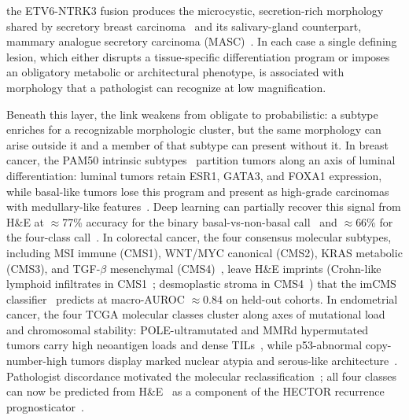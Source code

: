 the ETV6-NTRK3 fusion produces the microcystic, secretion-rich morphology shared by secretory breast carcinoma~\cite{tognonExpressionETV6NTRK3Gene2002} and its salivary-gland counterpart, mammary analogue secretory carcinoma (MASC)~\cite{skalovaMammaryAnalogueSecretory2010}.
In each case a single defining lesion, which either disrupts a tissue-specific differentiation program or imposes an obligatory metabolic or architectural phenotype, is associated with morphology that a pathologist can recognize at low magnification.

Beneath this layer, the link weakens from obligate to probabilistic: a subtype enriches for a recognizable morphologic cluster, but the same morphology can arise outside it and a member of that subtype can present without it. 
In breast cancer, the PAM50 intrinsic subtypes~\cite{parkerSupervisedRiskPredictor2009} partition tumors along an axis of luminal differentiation: luminal tumors retain ESR1, GATA3, and FOXA1 expression, while basal-like tumors lose this program and present as high-grade carcinomas~\cite{koboldtComprehensiveMolecularPortraits2012} with medullary-like features~\cite{livasyPhenotypicEvaluationBasallike2006}.
Deep learning can partially recover this signal from H\&E at $\approx$77\% accuracy for the binary basal-vs-non-basal call~\cite{coutureImageAnalysisDeep2018} and $\approx$66\% for the four-class call~\cite{jaberDeepLearningImagebased2020}.
In colorectal cancer, the four consensus molecular subtypes, including MSI immune (CMS1), WNT/MYC canonical (CMS2), KRAS metabolic (CMS3), and TGF-$\beta$ mesenchymal (CMS4)~\cite{guinneyConsensusMolecularSubtypes2015}, leave H\&E imprints (Crohn-like lymphoid infiltrates in CMS1~\cite{greensonPathologicPredictorsMicrosatellite2009}; desmoplastic stroma in CMS4~\cite{isellaStromalContributionColorectal2015}) that the imCMS classifier~\cite{sirinukunwattanaImagebasedConsensusMolecular2021} predicts at macro-AUROC $\approx$0.84 on held-out cohorts.
In endometrial cancer, the four TCGA molecular classes cluster along axes of mutational load and chromosomal stability: POLE-ultramutated and MMRd hypermutated tumors carry high neoantigen loads and dense TILs~\cite{howittAssociationPolymeraseEMutated2015}, while p53-abnormal copy-number-high tumors display marked nuclear atypia and serous-like architecture~\cite{levineIntegratedGenomicCharacterization2013, fremondInterpretableDeepLearning2023}. Pathologist discordance motivated the molecular reclassification~\cite{gilksPoorInterobserverReproducibility2013}; all four classes can now be predicted from H\&E~\cite{fremondInterpretableDeepLearning2023} as a component of the HECTOR recurrence prognosticator~\cite{volinsky-fremondPredictionRecurrenceRisk2024}.
